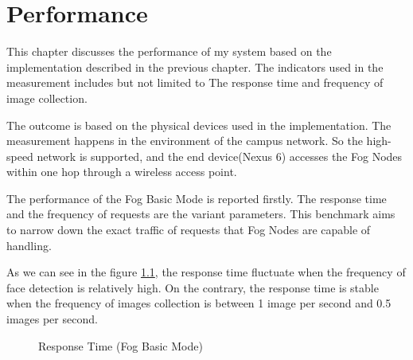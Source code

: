 \chapter{Performance} \label{chap:performance}
This chapter discusses the performance of my system based on the implementation described in the previous chapter. The indicators used in the measurement includes but not limited to The response time and frequency of image collection.

The outcome is based on the physical devices used in the implementation. The measurement happens in the environment of the campus network. So the high-speed network is supported, and the end device(Nexus 6) accesses the Fog Nodes within one hop through a wireless access point.

The performance of the Fog Basic Mode is reported firstly. The response time and the frequency of requests are the variant parameters. This benchmark aims to narrow down the exact traffic of requests that Fog Nodes are capable of handling.

As we can see in the figure \ref{fig:response_time_fog_basic}, the response time fluctuate when the frequency of face detection is relatively high. On the contrary, the response time is stable when the frequency of images collection is between 1 image per second and 0.5 images per second.


\begin{figure}
\centering
{}
\caption{Response Time (Fog Basic Mode)}
\label{fig:response_time_fog_basic}
\end{figure}

